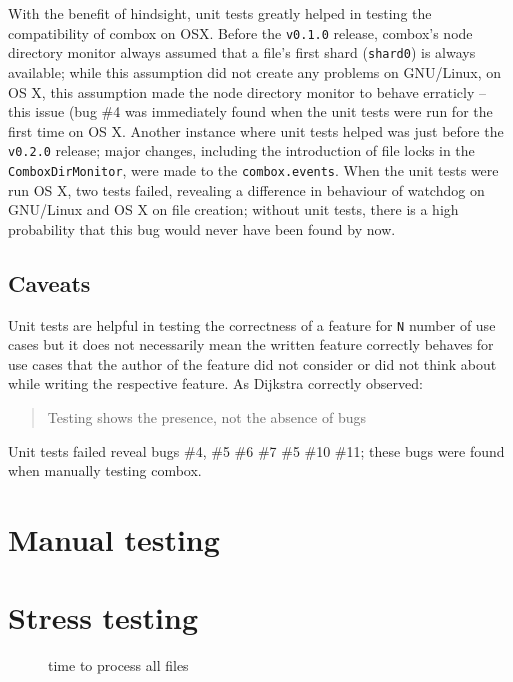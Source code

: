 With the benefit of hindsight, unit tests greatly helped in testing
the compatibility of combox on OSX. Before the \verb+v0.1.0+ release,
combox's node directory monitor always assumed that a file's first
shard (\verb+shard0+) is always available; while this assumption did
not create any problems on GNU/Linux, on OS X, this assumption made
the node directory monitor to behave erraticly -- this issue (bug
\#4\cite{combox-issue-tracker} was immediately found when the unit
tests were run for the first time on OS X. Another instance where unit
tests helped was just before the \verb+v0.2.0+ release; major changes,
including the introduction of file locks in the
\verb+ComboxDirMonitor+, were made to the \verb+combox.events+. When
the unit tests were run OS X, two tests failed, revealing a difference
in behaviour of watchdog\cite{pylib:watchdog} on GNU/Linux and OS X on
file creation\cite{combox-wd-fix}; without unit tests, there is a high
probability that this bug would never have been found by now.

\subsection{Caveats}

Unit tests are helpful in testing the correctness of a feature for
\verb+N+ number of use cases but it does not necessarily mean the
written feature correctly behaves for use cases that the author of the
feature did not consider or did not think about while writing the
respective feature. As Dijkstra correctly observed\cite{dijkstra69}:

\begin{quote}
Testing shows the presence, not the absence of bugs
\end{quote}

Unit tests failed reveal bugs \#4, \#5 \#6 \#7 \#5 \#10
\#11\cite{combox-issue-tracker}; these bugs were found when manually
testing combox.

\section{Manual testing}

\section{Stress testing}

\begin{figure}[h]
\centering

\caption{time to process all files}
\end{figure}

